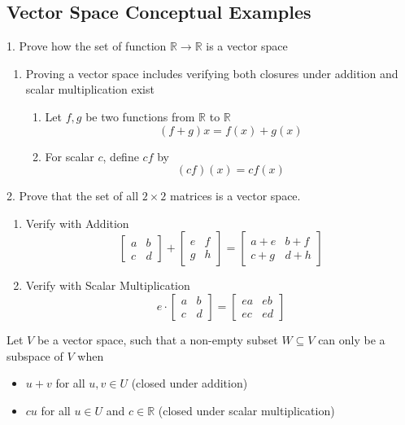 \subsection{Vector Space Conceptual Examples}
1. Prove how the set of function $\mathbb{R} \rightarrow \mathbb{R}$ is a vector space 
\begin{enumerate}
  \item Proving a vector space includes verifying both closures under addition and scalar 
    multiplication exist 
  \begin{enumerate}
    \item Let $f, g$ be two functions from $\mathbb{R}$ to $\mathbb{R}$ 
    \[
      (f + g)x = f(x) + g(x)
    \]
    \item For scalar $c$, define $cf$ by 
    \[
      (cf)(x) = cf(x)
    \]
  \end{enumerate}
\end{enumerate}
2. Prove that the set of all $2 \times 2$ matrices is a vector space. 
\begin{enumerate}
  \item Verify with Addition 
  \[
    \begin{bmatrix} a & b \\ c & d \end{bmatrix} + 
    \begin{bmatrix} e & f \\ g & h \end{bmatrix} = 
    \begin{bmatrix} a + e & b + f \\ c + g & d + h \end{bmatrix}
  \]
  \item Verify with Scalar Multiplication 
  \[
    e \cdot \begin{bmatrix} a & b \\ c & d \end{bmatrix} = 
    \begin{bmatrix} ea & eb \\ ec & ed \end{bmatrix}
  \]
\end{enumerate}
Let $V$ be a vector space, such that a non-empty subset $W \subseteq V$ can only be 
a subspace of $V$ when 
\begin{itemize}
  \item $u + v$ for all $u, v \in U$ (closed under addition) 
  \item $cu$ for all $u \in U$ and $c \in \mathbb{R}$ (closed under scalar multiplication)
\end{itemize}
